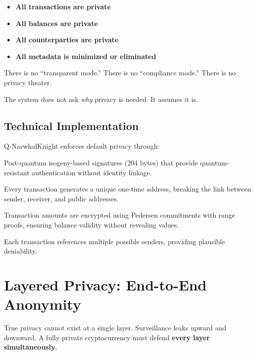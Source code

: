 \documentclass[12pt,a4paper]{article}
\begin{document}
\begin{itemize}[leftmargin=2cm]
    \item \textbf{All transactions are private}
    \item \textbf{All balances are private}
    \item \textbf{All counterparties are private}
    \item \textbf{All metadata is minimized or eliminated}
\end{itemize}

There is no ``transparent mode.''
There is no ``compliance mode.''
There is no privacy theater.

The system does not ask \textit{why} privacy is needed. It assumes it is.

\subsection{Technical Implementation}

Q-NarwhalKnight enforces default privacy through:

\begin{description}[leftmargin=1cm]
    \item[SQIsign Signatures:] Post-quantum isogeny-based signatures (204 bytes) that provide quantum-resistant authentication without identity linkage.
    \item[Stealth Addresses:] Every transaction generates a unique one-time address, breaking the link between sender, receiver, and public addresses.
    \item[Confidential Amounts:] Transaction amounts are encrypted using Pedersen commitments with range proofs, ensuring balance validity without revealing values.
    \item[Ring Signatures:] Each transaction references multiple possible senders, providing plausible deniability.
\end{description}

\section{Layered Privacy: End-to-End Anonymity}

True privacy cannot exist at a single layer. Surveillance leaks upward and downward. A fully private cryptocurrency must defend \textbf{every layer simultaneously}.
\end{document}
